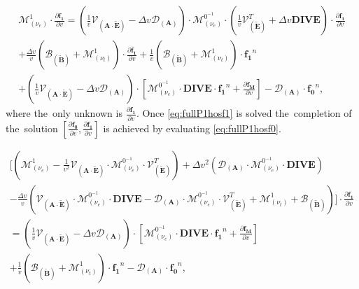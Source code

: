 \documentclass[preprint,12pt]{elsarticle}
\newcommand{\pdv}[2]{\frac{\partial{#1}}{\partial{#2}}}
\newcommand{\vect}[1]{\boldsymbol{#1}}
\newcommand{\matr}[1]{\mathbf{#1}}
\newcommand{\nue}{\nu_{e}}
\newcommand{\nutot}{\nu_{t}}
\newcommand{\vmag}{v}
\newcommand{\tE}{\vect{\tilde{E}}}
\newcommand{\tB}{\vect{\tilde{B}}}
\newcommand{\fM}{f_M}
\newcommand{\vfzero}{\vect{f_0}}
\newcommand{\fone}{\vect{f_1}}
\newcommand{\MA}{\matr{A}}
\newcommand{\IM}{\boldsymbol{\mathcal{M}}}
\newcommand{\ID}{\boldsymbol{\mathcal{D}}}
\newcommand{\IV}{\boldsymbol{\mathcal{V}}}
\newcommand{\IB}{\boldsymbol{\mathcal{B}}}
\begin{document}
\begin{multline}
  \IM^1_{(\nue)} \cdot \pdv{\fone}{\vmag}  
  = 
  \left(\frac{1}{\vmag}\IV_{\left(\MA \cdot \tE\right)}
  - \Delta\vmag \ID_{\left(\MA\right)} \right) \cdot
  \IM^{0^{-1}}_{(\nue)} \cdot 
  \left(\frac{1}{\vmag} \IV^T_{\left(\tE\right)} 
  + \Delta\vmag \matr{DIVE}
  \right)
  \cdot \pdv{\fone}{\vmag}
  \\
  +\frac{\Delta\vmag}{\vmag}\left(\IB_{\left( \tB \right)} 
  + \IM^1_{\left( \nutot \right)}\right) 
  \cdot \pdv{\fone}{\vmag} + 
  \frac{1}{\vmag}\left(\IB_{\left( \tB \right)} 
  + \IM^1_{\left( \nutot \right)}\right) 
  \cdot \fone^n\\ 
  +\left(\frac{1}{\vmag}\IV_{\left(\MA \cdot \tE\right)}
  - \Delta\vmag \ID_{\left(\MA\right)} \right) \cdot
  \left[  
  \IM^{0^{-1}}_{(\nue)} \cdot \matr{DIVE}\cdot\fone^n 
  + \pdv{\vect{\fM}}{\vmag}
  \right] - \ID_{\left(\MA\right)}\cdot\vfzero^n,
  \label{eq:fullP1hosf1}
\end{multline}
where the~only unknown is $\pdv{\fone}{\vmag}$. Once \eqref{eq:fullP1hosf1}
is solved the~completion of the~solution 
$[\pdv{\vfzero}{\vmag}, \pdv{\fone}{\vmag}]$ is achieved by evaluating 
\eqref{eq:fullP1hosf0}.
\cite{Dobrev_Kolev_Rieben-High-order_curvilinear_finite_element_methods_for_Lagrangian_hydrodynamics}

\begin{multline}
  \Bigg[
  \left(
  \IM^1_{(\nue)} - \frac{1}{\vmag^2}\IV_{\left(\MA \cdot \tE\right)} 
  \cdot\IM^{0^{-1}}_{(\nue)} \cdot \IV^T_{\left(\tE\right)}
  \right) 
  + \Delta\vmag^2 \left(\ID_{\left(\MA\right)} \cdot
  \IM^{0^{-1}}_{(\nue)} \cdot \matr{DIVE}\right)\\ 
  -\frac{\Delta\vmag}{\vmag}\left(
  \IV_{\left(\MA \cdot \tE\right)}\cdot\IM^{0^{-1}}_{(\nue)}\cdot\matr{DIVE}
  - \ID_{\left(\MA\right)} \cdot \IM^{0^{-1}}_{(\nue)} \cdot 
  \IV^T_{\left(\tE\right)}
  + \IM^1_{\left( \nutot \right)} + \IB_{\left( \tB \right)} 
  \right) \Bigg] \cdot \pdv{\fone}{\vmag} \\
  = 
  \left(\frac{1}{\vmag}\IV_{\left(\MA \cdot \tE\right)}
  - \Delta\vmag \ID_{\left(\MA\right)} \right) \cdot
  \left[  
  \IM^{0^{-1}}_{(\nue)} \cdot \matr{DIVE}\cdot\fone^n 
  + \pdv{\vect{\fM}}{\vmag}
  \right] \\  
  + \frac{1}{\vmag}\left(\IB_{\left( \tB \right)} 
  + \IM^1_{\left( \nutot \right)}\right) 
  \cdot \fone^n
  - \ID_{\left(\MA\right)}\cdot\vfzero^n,
\end{multline}
\end{document}
